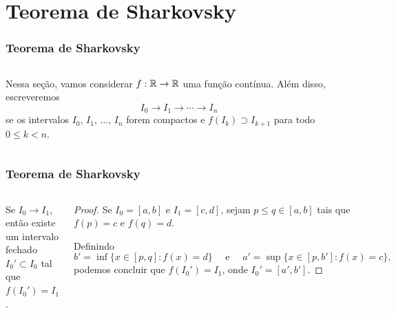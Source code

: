 \section{Teorema de Sharkovsky}


\begin{frame}
\vspace{5pt}
\frametitle{Teorema de Sharkovsky}
\begin{columns}
\column{\dimexpr\paperwidth-15pt}

Nessa seção, vamos considerar $f: \mathbb{R} \to \mathbb{R}$ uma função contínua.
Além disso, escreveremos
$$I_0 \longrightarrow I_1 \longrightarrow \cdots \longrightarrow I_n$$
se os intervalos $I_0, \, I_1, \, \dots, \, I_n$ forem compactos e $f(I_k) \supset I_{k+1}$ para todo $0 \leq k < n$.

\end{columns}
\end{frame}


\begin{frame}
\vspace{5pt}
\frametitle{Teorema de Sharkovsky}
\begin{columns}
\column{\dimexpr\paperwidth-15pt}

\begin{proposition}
Se $I_0 \longrightarrow I_1$, então existe um intervalo fechado $I_0' \subset I_0$ tal que $f(I_0') = I_1$.
\end{proposition}

\begin{proof}
Se $I_0 = [a, b]$ e $I_1 = [c, d]$, sejam $p \leq q \in [a, b]$ tais que $f(p) = c$ e $f(q) = d$.

Definindo
$$b' = \inf \lbrace x \in [p, q] : f(x) = d \rbrace \quad \text{ e } \quad a' = \sup \lbrace x \in [p, b'] : f(x) = c \rbrace,$$
podemos concluir que $f(I_0') = I_1$, onde $I_0' = [a', b']$.
\end{proof}

\end{columns}
\end{frame}


